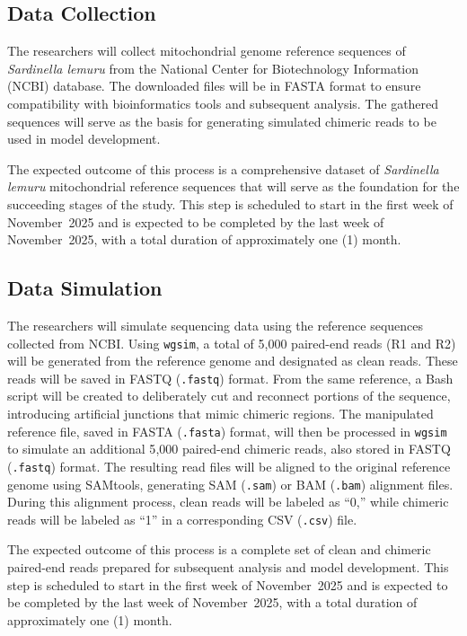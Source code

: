 \subsection{Data Collection}

The researchers will collect mitochondrial genome reference sequences of \textit{Sardinella lemuru} from the National Center for Biotechnology Information (NCBI) database. The downloaded files will be in FASTA format to ensure compatibility with bioinformatics tools and subsequent analysis. The gathered sequences will serve as the basis for generating simulated chimeric reads to be used in model development.

The expected outcome of this process is a comprehensive dataset of \textit{Sardinella lemuru} mitochondrial reference sequences that will serve as the foundation for the succeeding stages of the study. This step is scheduled to start in the first week of November~2025 and is expected to be completed by the last week of November~2025, with a total duration of approximately one (1) month.

\subsection{Data Simulation}

The researchers will simulate sequencing data using the reference sequences collected from NCBI. Using \texttt{wgsim}, a total of 5{,}000 paired-end reads (R1 and R2) will be generated from the reference genome and designated as clean reads. These reads will be saved in FASTQ (\texttt{.fastq}) format. From the same reference, a Bash script will be created to deliberately cut and reconnect portions of the sequence, introducing artificial junctions that mimic chimeric regions. The manipulated reference file, saved in FASTA (\texttt{.fasta}) format, will then be processed in \texttt{wgsim} to simulate an additional 5{,}000 paired-end chimeric reads, also stored in FASTQ (\texttt{.fastq}) format. The resulting read files will be aligned to the original reference genome using SAMtools, generating SAM (\texttt{.sam}) or BAM (\texttt{.bam}) alignment files. During this alignment process, clean reads will be labeled as ``0,'' while chimeric reads will be labeled as ``1'' in a corresponding CSV (\texttt{.csv}) file.

The expected outcome of this process is a complete set of clean and chimeric paired-end reads prepared for subsequent analysis and model development. This step is scheduled to start in the first week of November~2025 and is expected to be completed by the last week of November~2025, with a total duration of approximately one (1) month.

